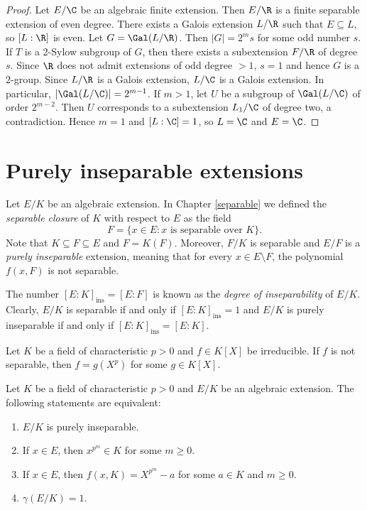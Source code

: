 \begin{proof}
    Let $E/\C$ be an algebraic finite extension. Then $E/\R$ 
    is a finite separable extension of even degree. There exists a Galois
    extension 
    $L/\R$ such that $E\subseteq L$, so $[L:\R]$ is even. Let $G=\Gal(L/\R)$. 
    Then $|G|=2^ms$ for some odd number $s$. If $T$ is a 2-Sylow subgroup
    of $G$, 
    then there exists a subextension $F/\R$ of degree $s$. Since 
    $\R$ does not admit extensions of odd degree $>1$, $s=1$ and
    hence $G$ is a $2$-group. Since 
    $L/\R$ is a Galois extension, $L/\C$ is a Galois extension. 
    In particular, $|\Gal(L/\C)|=2^{m-1}$. If $m>1$, 
    let $U$ be a subgroup of $\Gal(L/\C)$ of order $2^{m-2}$. Then $U$ corresponds 
    to a subextension $L_1/\C$ of degree two, a contradiction. Hence $m=1$ 
    and $[L:\C]=1$, so $L=\C$ and $E=\C$. 
\end{proof}

\section{Purely inseparable extensions}

Let $E/K$ be an algebraic extension. 
In Chapter \ref{separable} we defined the 
\emph{separable closure} of $K$ with respect to $E$ as 
the field 
\[
    F=\{x\in E:x\text{ is separable over }K\}.
\]
Note that $K\subseteq F\subseteq E$ 
and $F=K(F)$. Moreover, 
$F/K$ is separable and 
$E/F$ is a \emph{purely inseparable} extension, meaning that
for every $x\in E\setminus F$, the polynomial $f(x,F)$ is not separable. 

The number $[E:K]_{\operatorname{ins}}=[E:F]$ is known as the \emph{degree of inseparability} of $E/K$. 
Clearly, $E/K$ is separable if and only if $[E:K]_{\operatorname{ins}}=1$ and 
$E/K$ is purely inseparable if and only if $[E:K]_{\operatorname{ins}}=[E:K]$. 

\begin{exercise}
    \label{xca:separable_charp}
    Let $K$ be a field of characteristic $p>0$ and $f\in K[X]$ be irreducible.
    If $f$ is not separable, then $f=g(X^p)$ for some $g\in K[X]$. 
\end{exercise}



\begin{proposition}
Let $K$ be a field of characteristic $p>0$ and
$E/K$ be an algebraic extension. The following statements are equivalent:
\begin{enumerate}
    \item $E/K$ is purely inseparable.
    \item If $x\in E$, then $x^{p^m}\in K$ for some $m\geq0$.
    \item If $x\in E$, then $f(x,K)=X^{p^m}-a$ for some $a\in K$ and $m\geq0$. 
    \item $\gamma(E/K)=1$. 
\end{enumerate}
\end{proposition}

